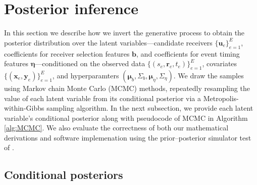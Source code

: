 \documentclass[ba]{imsart}
\numberwithin{equation}{section}
\theoremstyle{plain}
\begin{document}
	
	\section{Posterior inference}\label{sec:inference}
	In this section we describe how we invert the generative process to obtain the posterior distribution over the latent variables---candidate receivers $\{\boldsymbol{u}_e\}_{e=1}^E$, coefficients for receiver selection features $\boldsymbol{b}$, and coefficients for event timing features $\boldsymbol{\eta}$---conditioned on the observed data $\{(s_e, \boldsymbol{r}_e, t_e)\}_{e=1}^E$, covariates $\{(\boldsymbol{x}_e, \boldsymbol{y}_e)\}_{e=1}^E$, and hyperparamters $(\boldsymbol{\mu}_b, \Sigma_b, \boldsymbol{\mu}_\eta, \Sigma_\eta)$. We draw the samples using Markov chain Monte Carlo (MCMC) methods, repeatedly resampling the value of each latent variable from its conditional posterior via a Metropolis-within-Gibbs sampling algorithm. In the next subsection, we provide each latent variable's conditional posterior along with pseudocode of MCMC in Algorithm \ref{alg:MCMC}. We also evaluate the correctness of both our mathematical derivations and software implemenation using the prior--posterior simulator test of \cite{geweke2004getting}.
	
	\subsection{Conditional posteriors}\label{subsec:conditionaldist}
\end{document}
